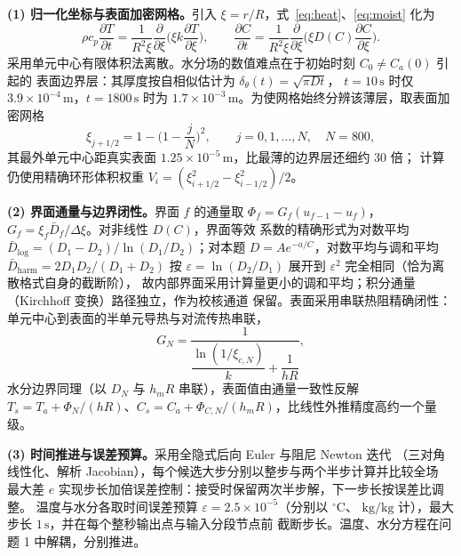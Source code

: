 \documentclass{ctexart}
\begin{document}
\textbf{(1) 归一化坐标与表面加密网格。}引入 $\xi=r/R$，式~\eqref{eq:heat}、\eqref{eq:moist}
化为
\begin{equation}
  \rho c_p\frac{\partial T}{\partial t}
  =\frac{1}{R^2\xi}\frac{\partial}{\partial \xi}\Big(\xi k\frac{\partial T}{\partial\xi}\Big),
  \qquad
  \frac{\partial C}{\partial t}
  =\frac{1}{R^2\xi}\frac{\partial}{\partial \xi}\Big(\xi D(C)\frac{\partial C}{\partial\xi}\Big).
  \label{eq:norm}
\end{equation}
采用单元中心有限体积法离散。水分场的数值难点在于初始时刻 $C_0\neq C_a(0)$ 引起的
表面边界层：其厚度按自相似估计为 $\delta_\theta(t)=\sqrt{\pi D t}$，
$t=10\,\mathrm{s}$ 时仅 $3.9\times10^{-4}\,\mathrm{m}$，$t=1800\,\mathrm{s}$ 时为
$1.7\times10^{-3}\,\mathrm{m}$。为使网格始终分辨该薄层，取表面加密网格
\begin{equation}
  \xi_{j+1/2}=1-\Big(1-\frac{j}{N}\Big)^2,\qquad j=0,1,\dots,N,\quad N=800,
  \label{eq:mesh}
\end{equation}
其最外单元中心距真实表面 $1.25\times10^{-5}\,\mathrm{m}$，比最薄的边界层还细约 30 倍；
计算仍使用精确环形体积权重 $V_i=(\xi_{i+1/2}^2-\xi_{i-1/2}^2)/2$。

\textbf{(2) 界面通量与边界闭性。}界面 $f$ 的通量取
$\Phi_f=G_f(u_{f-1}-u_f)$，$G_f=\xi_f\bar D_f/\Delta\xi$。对非线性 $D(C)$，界面等效
系数的精确形式为对数平均 $\bar D_{\log}=(D_1-D_2)/\ln(D_1/D_2)$；对本题
$D=Ae^{-a/C}$，对数平均与调和平均 $\bar D_{\mathrm{harm}}=2D_1D_2/(D_1+D_2)$ 按
$\varepsilon=\ln(D_2/D_1)$ 展开到 $\varepsilon^2$ 完全相同（恰为离散格式自身的截断阶），
故内部界面采用计算量更小的调和平均；积分通量（Kirchhoff 变换）路径独立，作为校核通道
保留\cite{srikiatden2007moisture}。表面采用串联热阻精确闭性：单元中心到表面的半单元导热与对流传热串联，
\begin{equation}
  G_N=\frac{1}{\dfrac{\ln(1/\xi_{c,N})}{k}+\dfrac{1}{hR}},
  \label{eq:GN}
\end{equation}
水分边界同理（以 $D_N$ 与 $h_mR$ 串联），表面值由通量一致性反解
$T_s=T_a+\Phi_N/(hR)$、$C_s=C_a+\Phi_{C,N}/(h_mR)$，比线性外推精度高约一个量级。

\textbf{(3) 时间推进与误差预算。}采用全隐式后向 Euler 与阻尼 Newton 迭代
（三对角线性化、解析 Jacobian），每个候选大步分别以整步与两个半步计算并比较全场
最大差 $e$ 实现步长加倍误差控制：接受时保留两次半步解，下一步长按误差比调整。
温度与水分各取时间误差预算 $\varepsilon=2.5\times10^{-5}$（分别以 $^{\circ}\mathrm{C}$、
$\mathrm{kg/kg}$ 计），最大步长 $1\,\mathrm{s}$，并在每个整秒输出点与输入分段节点前
截断步长。温度、水分方程在问题 1 中解耦，分别推进。
\end{document}
